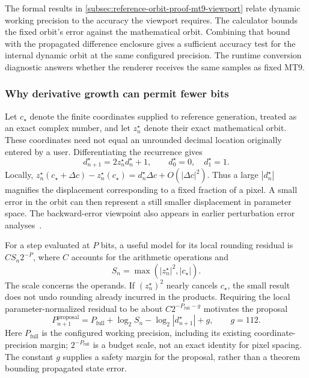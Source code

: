 The formal results in \cref{subsec:reference-orbit-proof-mt9-viewport}
relate dynamic working precision to the accuracy the viewport requires.
The calculator bounds the fixed orbit's error against the mathematical
orbit. Combining that bound with the propagated difference enclosure
gives a sufficient accuracy test for the internal dynamic orbit at the
same configured precision. The runtime conversion diagnostic answers
whether the renderer receives the same samples as fixed MT9.

\subsubsection{Why derivative growth can permit fewer bits}
\label{subsec:ref-orbit-dynamic-sensitivity}

Let $c_\star$ denote the finite coordinates supplied to reference generation,
treated as an exact complex number, and let $z_n^\star$ denote their exact
mathematical orbit. These coordinates need not equal an unrounded decimal
location originally entered by a user. Differentiating the recurrence gives
\begin{equation}
 d_{n+1}^\star=2z_n^\star d_n^\star+1,
 \qquad d_0^\star=0,\quad d_1^\star=1.
 \label{eq:dynamic-derivative}
\end{equation}
Locally, $z_n^\star(c_\star+\Delta c)-z_n^\star(c_\star)
=d_n^\star\Delta c+O(|\Delta c|^2)$. Thus a large $|d_n^\star|$ magnifies
the displacement corresponding to a fixed fraction of a pixel. A small error
in the orbit can then represent a still smaller displacement in parameter
space. The backward-error viewpoint also appears in earlier perturbation
error analyses~\cite{Knighty2016Accuracy,MandelbrotNotes2018}.

For a step evaluated at $P$ bits, a useful model for its local rounding residual
is $C S_n2^{-P}$, where $C$ accounts for the arithmetic operations and
\begin{equation}
 S_n=\max(|z_n^\star|^2,|c_\star|).
 \label{eq:dynamic-operand-scale}
\end{equation}
The scale concerns the operands. If $(z_n^\star)^2$ nearly cancels
$c_\star$, the small result does not undo rounding already incurred in the
products. Requiring the local parameter-normalized residual to be about
$C2^{-P_{\mathrm{full}}-g}$ motivates the proposal
\begin{equation}
 P_{n+1}^{\mathrm{proposal}}
 =P_{\mathrm{full}}+\log_2 S_n-\log_2|d_{n+1}^\star|+g,
 \qquad g=112.
 \label{eq:dynamic-precision-proposal}
\end{equation}
Here $P_{\mathrm{full}}$ is the configured working precision, including its
existing coordinate-precision margin; $2^{-P_{\mathrm{full}}}$ is a budget
scale, not an exact identity for pixel spacing. The constant $g$ supplies a
safety margin for the proposal, rather than a theorem bounding propagated state error.

